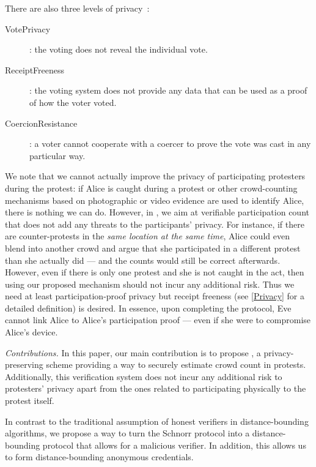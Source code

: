 There are also three levels of privacy~\cite{VerifyingPrivacyPropertiesOfVotingProtocols}:
\begin{description}
  \item[VotePrivacy]: the voting does not reveal the individual vote.
  \item[ReceiptFreeness]: the voting system does not provide any data that can be used as a proof of how the voter voted.
  \item[CoercionResistance]: a voter cannot cooperate with a coercer to prove the vote was cast in any particular way.
\end{description}
We note that we cannot actually improve the privacy of participating protesters during the protest: if Alice is caught during a protest or other crowd-counting mechanisms based on photographic or video evidence are used to identify Alice, there is nothing we can do. 
However, in \PRIVO, we aim at verifiable participation count that does not add any threats to the participants' privacy. 
For instance, if there are counter-protests in the \emph{same location at the same time}, Alice could even blend into another crowd and argue that she participated in a different protest than she actually did --- and the counts would still be correct afterwards.
However, even if there is only one protest and she is not caught in the act, then using our proposed mechanism should not incur any additional risk.
Thus we need at least participation-proof privacy but receipt freeness (see \cref{Privacy} for a detailed definition) is desired.
In essence, upon completing the protocol, Eve cannot link Alice to Alice's participation proof --- even if she were to compromise Alice's device.

\emph{Contributions.} In this paper, our main contribution is to propose \PRIVO, a privacy-preserving scheme providing a way to securely estimate crowd count in protests.
Additionally, this verification system does not incur any additional risk to protesters' privacy apart from the ones related to participating physically to the protest itself.

In contrast to the traditional assumption of honest verifiers in distance-bounding algorithms, we propose a way to turn the Schnorr protocol into a distance-bounding protocol that allows for a malicious verifier.
In addition, this allows us to form distance-bounding anonymous credentials.

